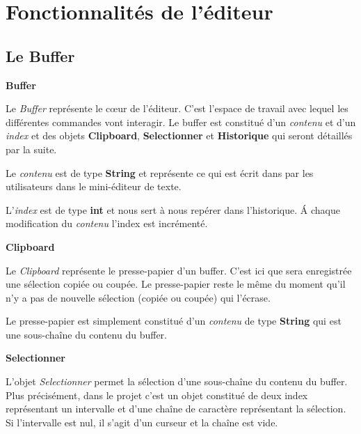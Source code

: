\documentclass[a4paper,11pt]{article}
\begin{document}
\clearpage

%
%

\section{Fonctionnalités de l'éditeur}\label{sec:fonc}
\bigskip

\subsection{Le Buffer}\label{subsec:buffer}
\bigskip

\large{\textbf{Buffer}}
\medskip

\noindent Le \emph{Buffer} représente le c\oe{}ur de l'éditeur. C'est l'espace de travail avec lequel les différentes commandes vont interagir.
Le buffer est constitué d'un \textit{contenu} et d'un \textit{index} et des objets \textbf{Clipboard}, \textbf{Selectionner} et \textbf{Historique} qui seront détaillés par la suite.
\smallskip

\noindent Le \textit{contenu} est de type \textbf{String} et représente ce qui est écrit dans par les utilisateurs dans le mini-éditeur de texte.
\smallskip

\noindent L'\textit{index} est de type \textbf{int} et nous sert à nous repérer dans l'historique. \'A chaque modification du \textit{contenu} l'index est incrémenté.

\bigskip

\large{\textbf{Clipboard}}
\medskip

\noindent Le \emph{Clipboard} représente le presse-papier d'un buffer. C'est ici que sera enregistrée une sélection copiée ou coupée. Le presse-papier reste le même du moment qu'il n'y a pas de nouvelle sélection (copiée ou coupée) qui l'écrase.
\smallskip

\noindent Le presse-papier est simplement constitué d'un \textit{contenu} de type \textbf{String} qui est une sous-chaîne du contenu du buffer.
\bigskip

\large{\textbf{Selectionner}}
\medskip

\noindent L'objet \emph{Selectionner} permet la sélection d'une sous-chaîne du contenu du buffer. Plus précisément, dans le projet c'est un objet constitué de deux index représentant un intervalle et d'une chaîne de caractère représentant la sélection. Si l'intervalle est nul, il s'agit d'un curseur et la chaîne est vide.
\bigskip
\end{document}
